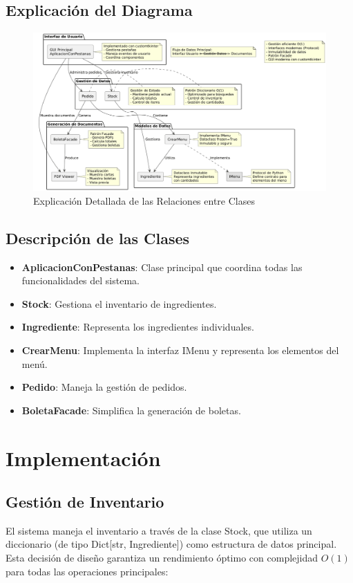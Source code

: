 \documentclass[12pt,letterpaper]{article}
\begin{document}
\subsection{Explicación del Diagrama}
\begin{figure}[H]
    \centering
    \includegraphics[width=\textwidth]{./images/explicacion_diagrama.png}
    \caption{Explicación Detallada de las Relaciones entre Clases}\label{fig:explicacion-diagrama}
\end{figure}

\subsection{Descripción de las Clases}
\begin{itemize}
    \item \textbf{AplicacionConPestanas}: Clase principal que coordina todas las funcionalidades del sistema.
    \item \textbf{Stock}: Gestiona el inventario de ingredientes.
    \item \textbf{Ingrediente}: Representa los ingredientes individuales.
    \item \textbf{CrearMenu}: Implementa la interfaz IMenu y representa los elementos del menú.
    \item \textbf{Pedido}: Maneja la gestión de pedidos.
    \item \textbf{BoletaFacade}: Simplifica la generación de boletas.
\end{itemize}

\section{Implementación}
\subsection{Gestión de Inventario}
El sistema maneja el inventario a través de la clase Stock, que utiliza un diccionario (de tipo Dict[str, Ingrediente]) como estructura de datos principal. Esta decisión de diseño garantiza un rendimiento óptimo con complejidad $O(1)$ para todas las operaciones principales:
\end{document}
